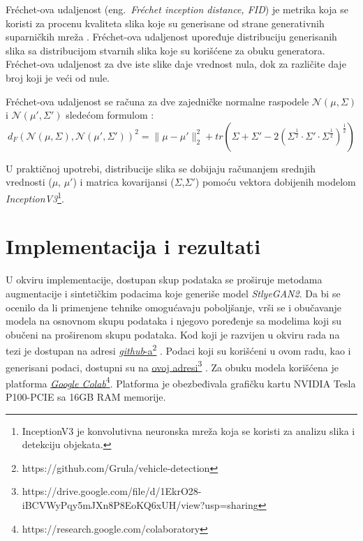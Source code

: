 \documentclass[12pt,oneside]{memoir}
\begin{document}
Fréchet-ova udaljenost (eng.~\textit{Fréchet inception distance, FID}) je metrika koja se koristi za procenu kvaliteta slika koje su generisane od strane generativnih suparničkih mreža \cite{heusel2017gans}. Fréchet-ova udaljenost upoređuje distribuciju generisanih slika sa distribucijom stvarnih slika koje su korišćene za obuku generatora. Fréchet-ova udaljenost za dve iste slike daje vrednost nula, dok za različite daje broj koji je veći od nule.  

Fréchet-ova udaljenost se računa za dve zajedničke normalne raspodele \(\mathcal{N}(\mu,\Sigma)\) i \(\mathcal{N}(\mu',\Sigma')\) sledećom formulom \cite{dowson1982frechet, heusel2017gans}:
\begin{equation}
    d_{F}(\mathcal N(\mu, \Sigma), \mathcal N(\mu', \Sigma'))^2 =
        \| \mu - \mu' \|^{2}_{2} + 
        tr\left(\Sigma + \Sigma' -
        2\left(\Sigma^\frac{1}{2} \cdot \Sigma' \cdot \Sigma^\frac{1}{2} \right)^\frac{1}{2} \right)
\end{equation}

U praktičnoj upotrebi, distribucije slika se dobijaju računanjem srednjih vrednosti (\(\mu\), \(\mu'\)) i matrica kovarijansi (\(\Sigma\),\(\Sigma'\)) pomoću vektora dobijenih modelom \textit{InceptionV3}\footnote{InceptionV3 je konvolutivna neuronska mreža koja se koristi za analizu slika i detekciju objekata.}.


\clearpage
\chapter{Implementacija i rezultati}
\label{section5}

U okviru implementacije, dostupan skup podataka se proširuje metodama augmentacije i sintetičkim podacima koje generiše model \textit{StlyeGAN2}.
Da bi se ocenilo da li primenjene tehnike omogućavaju poboljšanje, vrši se i obučavanje modela na osnovnom skupu podataka i njegovo poređenje sa modelima koji su obučeni na proširenom skupu podataka.
Kod koji je razvijen u okviru rada na tezi je dostupan na adresi  \underline{\href{https://github.com/Grula/vehicle-detection}{\textit{github}-a}}\footnote{https://github.com/Grula/vehicle-detection} \cite{vehicleGit2022}. Podaci koji su korišćeni u ovom radu, kao i generisani podaci, dostupni su na \href{https://drive.google.com/file/d/1EkrO28-iBCVWyPqy5mJXn8P8EoKQ6xUH/view?usp=sharing}{\underline{ovoj adresi}}\footnote{https://drive.google.com/file/d/1EkrO28-iBCVWyPqy5mJXn8P8EoKQ6xUH/view?usp=sharing} \cite{vehicleData2022}. Za obuku modela korišćena je platforma \href{https://research.google.com/colaboratory/}{\underline{\textit{Google Colab}}}\footnote{https://research.google.com/colaboratory}. Platforma je obezbeđivala grafičku kartu NVIDIA Tesla P100-PCIE sa 16GB RAM memorije. 
\end{document}
